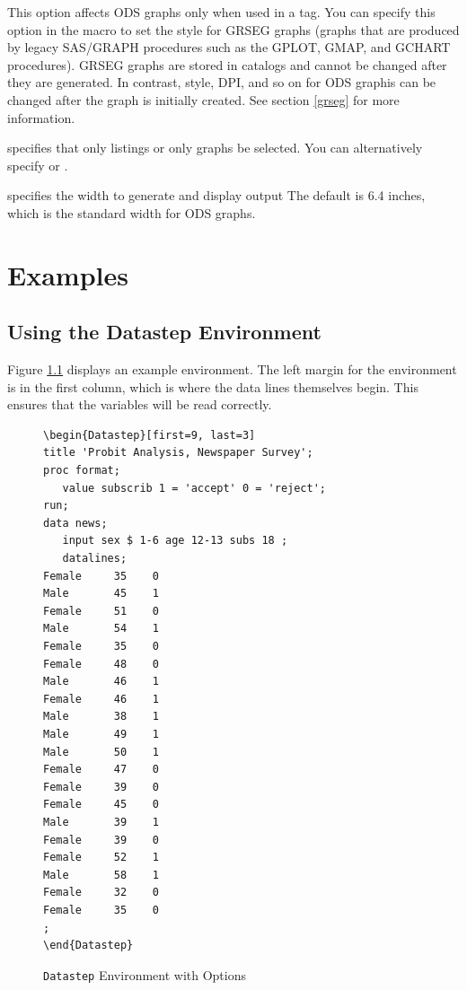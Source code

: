 \documentclass[article,oneside]{memoir}
\begin{document}
\begin{description}
    This option affects ODS graphs only when used in a  tag.
    You can specify this option in the  macro to set the style
    for GRSEG graphs (graphs that are produced by legacy SAS/GRAPH
    procedures such as the GPLOT, GMAP, and GCHART procedures).
    GRSEG graphs are stored in catalogs
    and cannot be changed after they are generated. In contrast,
    style, DPI, and so on for ODS graphis can be changed after the graph is initially created.
    See section \ref{grseg} for more information.

 \item[\Code{type=\emph{listing}|\emph{graph}}] specifies that only listings or
  only graphs be selected.
  You can alternatively specify  or .
      \item[\Code{width=}] specifies the width to generate and display  output
           The default is 6.4 inches, which is the standard width for ODS graphs.

  \end{description}

\chapter{Examples}
\section{Using the Datastep Environment}\label{dsex}
  Figure \ref{fig:sd2} displays an example  environment. The left margin for
  the environment is in the first column, which is where the data lines themselves begin.
  This ensures that the variables will be read correctly.

\begin{figure}[H]
\begin{snugshade}
\begin{verbatim}
\begin{Datastep}[first=9, last=3]
title 'Probit Analysis, Newspaper Survey';
proc format;
   value subscrib 1 = 'accept' 0 = 'reject';
run;
data news;
   input sex $ 1-6 age 12-13 subs 18 ;
   datalines;
Female     35    0
Male       45    1
Female     51    0
Male       54    1
Female     35    0
Female     48    0
Male       46    1
Female     46    1
Male       38    1
Male       49    1
Male       50    1
Female     47    0
Female     39    0
Female     45    0
Male       39    1
Female     39    0
Female     52    1
Male       58    1
Female     32    0
Female     35    0
;
\end{Datastep}
\end{verbatim}
\end{snugshade}
\caption{\texttt{Datastep} Environment with Options}\label{fig:sd2}
\end{figure}
\end{document}

